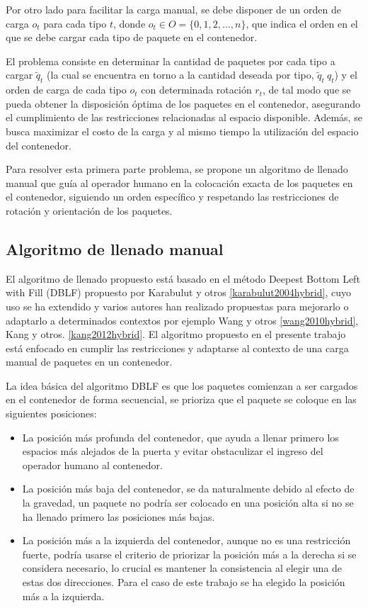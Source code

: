 Por otro lado para facilitar la carga manual, se debe disponer de un orden de carga $o_t$ para cada tipo $t$, donde $o_t \in O = \{0, 1, 2, \ldots, n\}$, que indica el orden en el que se debe cargar cada tipo de paquete en el contenedor.

El problema consiste en determinar la cantidad de paquetes por cada tipo a cargar $\tilde{q}_t$ (la cual se encuentra en torno a la cantidad deseada por tipo, $\tilde{q}_t ~ q_t$) y el orden de carga de cada tipo $o_t$ con determinada rotación $r_t$, de tal modo que se pueda obtener la disposición óptima de los paquetes en el contenedor, asegurando el cumplimiento de las restricciones relacionadas al espacio disponible. Además, se busca maximizar el costo de la carga y al mismo tiempo la utilización del espacio del contenedor.

Para resolver esta primera parte problema, se propone un algoritmo de llenado manual que guía al operador humano en la colocación exacta de los paquetes en el contenedor, siguiendo un orden específico y respetando las restricciones de rotación y orientación de los paquetes.

\subsection{Algoritmo de llenado manual}

El algoritmo de llenado propuesto está basado en el método Deepest Bottom Left with Fill (DBLF) propuesto por Karabulut y otros \ref{karabulut2004hybrid}, cuyo uso se ha extendido y varios autores han realizado propuestas para mejorarlo o adaptarlo a determinados contextos por ejemplo Wang y otros \ref{wang2010hybrid}, Kang y otros. \ref{kang2012hybrid}. El algoritmo propuesto en el presente trabajo está enfocado en cumplir las restricciones y adaptarse al contexto de una carga manual de paquetes en un contenedor.

La idea básica del algoritmo DBLF es que los paquetes comienzan a ser cargados en el contenedor de forma secuencial, se prioriza que el paquete se coloque en las siguientes posiciones: 

\begin{itemize}
    \item La posición más profunda del contenedor, que ayuda a llenar primero los espacios más alejados de la puerta y evitar obstaculizar el ingreso del operador humano al contenedor.
    \item La posición más baja del contenedor, se da naturalmente debido al efecto de la gravedad, un paquete no podría ser colocado en una posición alta si no se ha llenado primero las posiciones más bajas.
    \item La posición más a la izquierda del contenedor, aunque no es una restricción fuerte, podría usarse el criterio de priorizar la posición más a la derecha si se considera necesario, lo crucial es mantener la consistencia al elegir una de estas dos direcciones. Para el caso de este trabajo se ha elegido la posición más a la izquierda.
\end{itemize}

